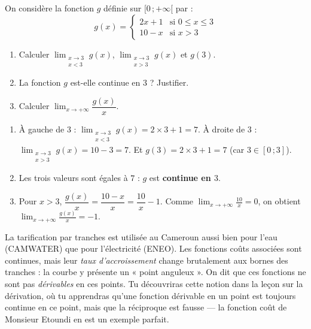 \documentclass[11pt]{article}
\begin{document}
\begin{exercice}
On considère la fonction $g$ définie sur $[0\,;+\infty[$ par :
\[ g(x) = \begin{cases} 2x + 1 & \text{si } 0 \leq x \leq 3 \\ 10 - x & \text{si } x > 3 \end{cases} \]
\begin{enumerate}
\item Calculer $\displaystyle\lim_{\substack{x \to 3 \\ x < 3}} g(x)$, $\displaystyle\lim_{\substack{x \to 3 \\ x > 3}} g(x)$ et $g(3)$.
\item La fonction $g$ est-elle continue en $3$ ? Justifier.
\item Calculer $\displaystyle\lim_{x \to +\infty} \dfrac{g(x)}{x}$.
\end{enumerate}
\end{exercice}

\begin{corrige}
\begin{enumerate}
\item À gauche de $3$ : $\displaystyle\lim_{\substack{x \to 3 \\ x < 3}} g(x) = 2 \times 3 + 1 = 7$. À droite de $3$ : $\displaystyle\lim_{\substack{x \to 3 \\ x > 3}} g(x) = 10 - 3 = 7$. Et $g(3) = 2 \times 3 + 1 = 7$ (car $3 \in [0\,;3]$).
\item Les trois valeurs sont égales à $7$ : $g$ est \textbf{continue en $3$}.
\item Pour $x > 3$, $\dfrac{g(x)}{x} = \dfrac{10 - x}{x} = \dfrac{10}{x} - 1$. Comme $\displaystyle\lim_{x \to +\infty} \frac{10}{x} = 0$, on obtient $\displaystyle\lim_{x \to +\infty} \frac{g(x)}{x} = -1$.
\end{enumerate}
\end{corrige}

\begin{savaistu}
La tarification par tranches est utilisée au Cameroun aussi bien pour l'eau (CAMWATER) que pour l'électricité (ENEO). Les fonctions coûts associées sont continues, mais leur \emph{taux d'accroissement} change brutalement aux bornes des tranches : la courbe y présente un « point anguleux ». On dit que ces fonctions ne sont pas \emph{dérivables} en ces points. Tu découvriras cette notion dans la leçon sur la dérivation, où tu apprendras qu'une fonction dérivable en un point est toujours continue en ce point, mais que la réciproque est fausse — la fonction coût de Monsieur Etoundi en est un exemple parfait.
\end{savaistu}
\end{document}
